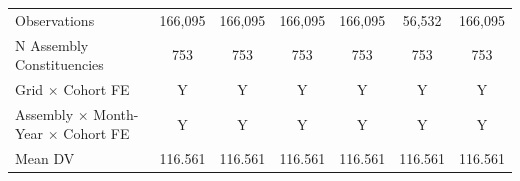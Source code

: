 \begin{tabular}{lcccccc}
Observations&     166,095         &     166,095         &     166,095         &     166,095         &      56,532         &     166,095         \\
N Assembly Constituencies&         753         &         753         &         753         &         753         &         753         &         753         \\
Grid $\times$ Cohort FE&           Y         &           Y         &           Y         &           Y         &           Y         &           Y         \\
Assembly $\times$ Month-Year $\times$ Cohort FE&           Y         &           Y         &           Y         &           Y         &           Y         &           Y         \\
Mean DV     &     116.561         &     116.561         &     116.561         &     116.561         &     116.561         &     116.561         \\
\hline
\end{tabular}
